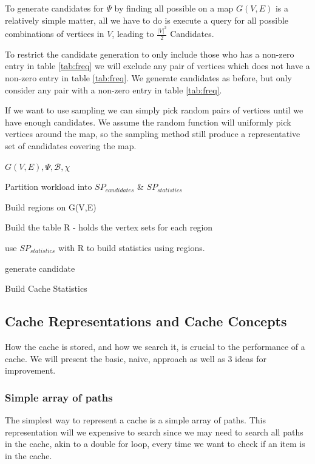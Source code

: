 To generate \spath candidates for $\Psi$ by finding all possible \spath on a map $G(V,E)$ is a relatively simple matter, all we have to do is execute a \spath query for all possible combinations of vertices in $V$, leading to $\frac{|V|^2}{2}$ Candidates.

To restrict the candidate generation to only include those who has a non-zero entry in table \ref{tab:freq} we will exclude any pair of vertices which does not have a non-zero entry in table \ref{tab:freq}. We generate candidates as before, but only consider any pair with a non-zero entry in table \ref{tab:freq}.

If we want to use sampling we can simply pick random pairs of vertices until we have enough candidates. We assume the random function will uniformly pick vertices around the map, so the sampling method still produce a representative set of candidates covering the map.


\begin{algorithm} [H!bt]
\dontprintsemicolon
\SetVline


\Input
{

$G(V,E), \Psi, \mathcal{B}, \chi$
}

Partition workload into $SP_{candidates}$ \& $SP_{statistics}$ \;

Build regions on G(V,E) \;

Build the table R - holds the vertex sets for each region \;

use $SP_{statistics}$ with R to build statistics using regions. \;


{
    generate candidate \;
}


\caption{Build Cache Statistics}
\label{alg:buildstatis}
\end{algorithm}



\subsection{Cache Representations and Cache Concepts} \label{subsec:cacherepresentatons}
How the cache is stored, and how we search it, is crucial to the performance of a cache. We will present the basic, naive, approach as well as 3 ideas for improvement.
% 
\subsubsection{Simple array of paths}%
The simplest way to represent a cache is a simple array of paths. This representation will we expensive to search since we may need to search all paths in the cache, akin to a double for loop, every time we want to check if an item is in the cache.

